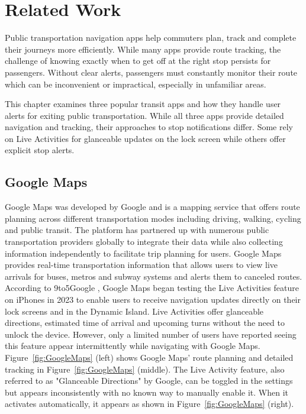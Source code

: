 \chapter{Related Work}
\label{cha:RelatedWork}

Public transportation navigation apps help commuters plan, track and complete their journeys more efficiently. 
While many apps provide route tracking, the challenge of knowing exactly when to get off at the right stop persists for passengers.
Without clear alerts, passengers must constantly monitor their route which can be inconvenient or impractical, especially in unfamiliar areas.

This chapter examines three popular transit apps and how they handle user alerts for exiting public transportation.
While all three apps provide detailed navigation and tracking, their approaches to stop notifications differ.
Some rely on Live Activities for glanceable updates on the lock screen while others offer explicit stop alerts.

\section{Google Maps}
Google Maps was developed by Google and is a mapping service that offers route planning across different transportation modes including driving, walking, cycling and public transit. 
The platform has partnered up with numerous public transportation providers globally to integrate their data while also collecting information independently to facilitate trip planning for users.
Google Maps provides real-time transportation information that allows users to view live arrivals for buses, metros and subway systems and alerts them to canceled routes.
According to 9to5Google \cite{google_maps_live_activity}, Google Maps began testing the Live Activities feature on iPhones in 2023 to enable users to receive navigation updates directly on their lock screens and in the Dynamic Island. 
Live Activities offer glanceable directions, estimated time of arrival and upcoming turns without the need to unlock the device.
However, only a limited number of users have reported seeing this feature appear intermittently while navigating with Google Maps.
Figure~\ref{fig:GoogleMaps} (left) shows Google Maps' route planning and detailed tracking in Figure~\ref{fig:GoogleMaps} (middle). 
The Live Activity feature, also referred to as "Glanceable Directions" by Google, can be toggled in the settings but appears inconsistently with no known way to manually enable it. 
When it activates automatically, it appears as shown in Figure~\ref{fig:GoogleMaps} (right).

